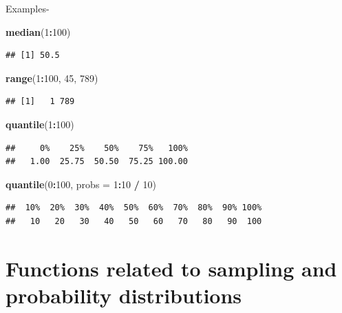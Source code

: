 \documentclass[
]{book}
\newenvironment{Shaded}{\begin{snugshade}}{\end{snugshade}}
\newcommand{\AttributeTok}[1]{\textcolor[rgb]{0.13,0.29,0.53}{#1}}
\newcommand{\DecValTok}[1]{\textcolor[rgb]{0.00,0.00,0.81}{#1}}
\newcommand{\FunctionTok}[1]{\textcolor[rgb]{0.13,0.29,0.53}{\textbf{#1}}}
\newcommand{\NormalTok}[1]{#1}
\newcommand{\SpecialCharTok}[1]{\textcolor[rgb]{0.81,0.36,0.00}{\textbf{#1}}}
\begin{document}
Examples-

\begin{Shaded}
\begin{Highlighting}[]
\FunctionTok{median}\NormalTok{(}\DecValTok{1}\SpecialCharTok{:}\DecValTok{100}\NormalTok{)}
\end{Highlighting}
\end{Shaded}

\begin{verbatim}
## [1] 50.5
\end{verbatim}

\begin{Shaded}
\begin{Highlighting}[]
\FunctionTok{range}\NormalTok{(}\DecValTok{1}\SpecialCharTok{:}\DecValTok{100}\NormalTok{, }\DecValTok{45}\NormalTok{, }\DecValTok{789}\NormalTok{)}
\end{Highlighting}
\end{Shaded}

\begin{verbatim}
## [1]   1 789
\end{verbatim}

\begin{Shaded}
\begin{Highlighting}[]
\FunctionTok{quantile}\NormalTok{(}\DecValTok{1}\SpecialCharTok{:}\DecValTok{100}\NormalTok{)}
\end{Highlighting}
\end{Shaded}

\begin{verbatim}
##     0%    25%    50%    75%   100% 
##   1.00  25.75  50.50  75.25 100.00
\end{verbatim}

\begin{Shaded}
\begin{Highlighting}[]
\FunctionTok{quantile}\NormalTok{(}\DecValTok{0}\SpecialCharTok{:}\DecValTok{100}\NormalTok{, }\AttributeTok{probs =} \DecValTok{1}\SpecialCharTok{:}\DecValTok{10} \SpecialCharTok{/} \DecValTok{10}\NormalTok{)}
\end{Highlighting}
\end{Shaded}

\begin{verbatim}
##  10%  20%  30%  40%  50%  60%  70%  80%  90% 100% 
##   10   20   30   40   50   60   70   80   90  100
\end{verbatim}

\hypertarget{prob}{%
\section{Functions related to sampling and probability distributions}\label{prob}}
\end{document}

